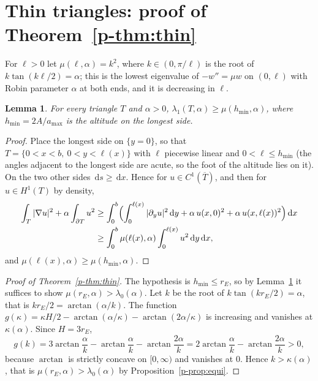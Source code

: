 \documentclass[11pt]{article}
\newtheorem{lemma}[theorem]{Lemma}
\theoremstyle{remark}
\newcommand{\dd}{\,\mathrm{d}}
\begin{document}
\section{Thin triangles: proof of Theorem~\ref{p-thm:thin}}\label{p-sec:thin}

For $\ell>0$ let $\mu(\ell,\alpha)=k^2$, where $k\in(0,\pi/\ell)$ is the root of
$k\tan(k\ell/2)=\alpha$; this is the lowest eigenvalue of $-w''=\mu w$ on $(0,\ell)$ with Robin
parameter $\alpha$ at both ends, and it is decreasing in $\ell$.

\begin{lemma}\label{p-lem:slice}
For every triangle $T$ and $\alpha>0$, $\lambda_1(T,\alpha)\ge\mu(h_{\min},\alpha)$, where
$h_{\min}=2A/a_{\max}$ is the altitude on the longest side.
\end{lemma}

\begin{proof}
Place the longest side on $\{y=0\}$, so that $T=\{0<x<b,\ 0<y<\ell(x)\}$ with $\ell$ piecewise
linear and $0<\ell\le h_{\min}$ (the angles adjacent to the longest side are acute, so the
foot of the altitude lies on it). On the two other sides $\dd s\ge\dd x$. Hence for
$u\in C^1(\overline T)$, and then for $u\in H^1(T)$ by density,
\begin{align*}
  \int_T|\nabla u|^2+\alpha\int_{\partial T}u^2
  &\ge\int_0^b\Bigl(\int_0^{\ell(x)}|\partial_yu|^2\dd y
      +\alpha\,u(x,0)^2+\alpha\,u(x,\ell(x))^2\Bigr)\dd x\\
  &\ge\int_0^b\mu(\ell(x),\alpha)\int_0^{\ell(x)}u^2\dd y\dd x ,
\end{align*}
and $\mu(\ell(x),\alpha)\ge\mu(h_{\min},\alpha)$.
\end{proof}

\begin{proof}[Proof of Theorem~\ref{p-thm:thin}]
The hypothesis is $h_{\min}\le r_E$, so by Lemma~\ref{p-lem:slice} it suffices to show
$\mu(r_E,\alpha)>\lambda_0(\alpha)$. Let $k$ be the root of $k\tan(kr_E/2)=\alpha$, that is
$kr_E/2=\arctan(\alpha/k)$. The function
$g(\kappa)=\kappa H/2-\arctan(\alpha/\kappa)-\arctan(2\alpha/\kappa)$ is increasing and vanishes
at $\kappa(\alpha)$. Since $H=3r_E$,
\[
  g(k)=3\arctan\frac{\alpha}{k}-\arctan\frac{\alpha}{k}-\arctan\frac{2\alpha}{k}
  =2\arctan\frac{\alpha}{k}-\arctan\frac{2\alpha}{k}>0,
\]
because $\arctan$ is strictly concave on $[0,\infty)$ and vanishes at $0$. Hence
$k>\kappa(\alpha)$, that is $\mu(r_E,\alpha)>\lambda_0(\alpha)$ by
Proposition~\ref{p-prop:equi}.
\end{proof}
\end{document}
